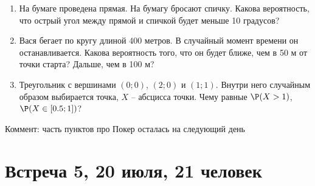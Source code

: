\documentclass[pdftex,12pt,a4paper]{article}
\begin{document}
\begin{enumerate}[resume]
\item На бумаге проведена прямая. На бумагу бросают спичку. Какова
вероятность, что острый угол между прямой и спичкой будет меньше
10 градусов?
\item Вася бегает по кругу длиной 400 метров. В случайный момент
времени он останавливается. Какова вероятность того, что он будет
ближе, чем в 50 м от точки старта? Дальше, чем в 100 м?
\item Треугольник с вершинами $(0;0)$, $(2;0)$ и $(1;1)$. Внутри него случайным образом выбирается точка, $X$ -- абсцисса точки. Чему равные $\P(X>1)$, $\P(X\in [0.5;1])$?
\end{enumerate}

Коммент: часть пунктов про Покер осталась на следующий день


\newpage
\section{Встреча 5, 20 июля, 21 человек}
\end{document}
